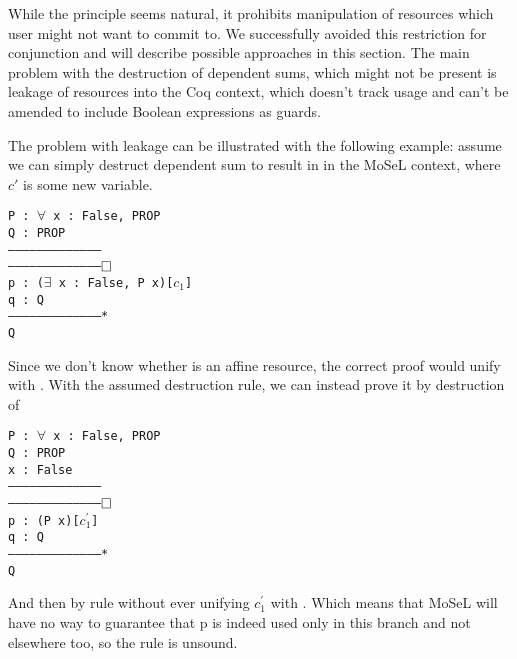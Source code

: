 While the principle seems natural, it prohibits manipulation of resources which user might not want to commit to.
We successfully avoided this restriction for conjunction and will describe possible approaches in this section.
The main problem with the destruction of dependent sums, which might not be present is leakage of resources into the Coq context, which doesn't track usage and can't be amended to include Boolean expressions as guards.

The problem with leakage can be illustrated with the following example: assume we can simply destruct dependent sum  to result in  in the MoSeL context, where \(c'\) is some new variable.

\begin{minipage}{\linewidth}
\texttt{P : $\forall$ x : False, PROP\\
Q : PROP\\
---------------------------------------\\
---------------------------------------$\mathop{\Box}$\\
p : ($\exists$ x : False, P x)[$c_1$]\\
q : Q\\
---------------------------------------*\\
Q
}
\end{minipage}

Since we don't know whether  is an affine resource, the correct proof would unify  with \false.
With the assumed destruction rule, we can instead prove it by destruction of \\

\begin{minipage}{\linewidth}
\texttt{P : $\forall$ x : False, PROP\\
Q : PROP\\
x : False\\
---------------------------------------\\
---------------------------------------$\mathop{\Box}$\\
p : (P x)[$c^{'}_1$]\\
q : Q\\
---------------------------------------*\\
Q
}
\end{minipage}
And then by  rule without ever unifying $c^{'}_1$ with \true.
Which means that MoSeL will have no way to guarantee that p is indeed used only in this branch and not elsewhere too, so the rule is unsound.

